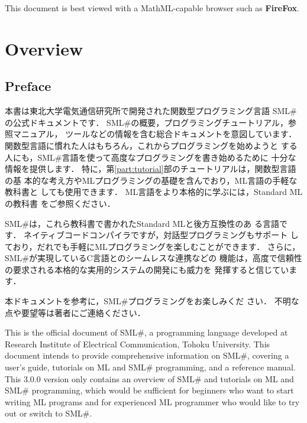 \documentclass{jbook}
\date{\today}
\title{\txt{プログラミング言語\smlsharp{}解説}{\smlsharp{} Document}}
\author{
\authors
}
\newif\ifjp
\newcommand{\txt}[2]{#2}
\newcommand{\smlsharp}{SML\#}
\newcommand{\version}{3.0.0}
\begin{document}
\maketitle

\tableofcontents


\ifjp%
{\bf FireFox}などのMathMLを表示可能なブラウザでご覧ください．
\else%
This document is best viewed with a MathML-capable browser such as {\bf FireFox}.
\fi%

%
\part{\txt{概要}{Overview}}
\label{part:outline}

\chapter{\txt{はじめに}{Preface}}

\ifjp%
	本書は東北大学電気通信研究所で開発された関数型プログラミング言語
\smlsharp{}の公式ドキュメントです．
	\smlsharp{}の概要，プログラミングチュートリアル，参照マニュアル，
ツールなどの情報を含む総合ドキュメントを意図しています．
	関数型言語に慣れた人はもちろん，これからプログラミングを始めようと
する人にも，\smlsharp{}言語を使って高度なプログラミングを書き始めるために
十分な情報を提供します．
	特に，第\ref{part:tutorial}部のチュートリアルは，関数型言語の基
本的な考え方やMLプログラミングの基礎を含んでおり，ML言語の手軽な教科書と
しても使用できます．
	ML言語をより本格的に学ぶには，Standard MLの教科書
\cite{ohori00sml}をご参照ください．
  
	\smlsharp{}は，これら教科書で書かれたStandard MLと後方互換性のあ
る言語です．
	ネイティブコードコンパイラですが，対話型プログラミングもサポート
しており，だれでも手軽にMLプログラミングを楽しむことができます．
	さらに，\smlsharp{}が実現しているC言語とのシームレスな連携などの
機能は，高度で信頼性の要求される本格的な実用的システムの開発にも威力を
発揮すると信じています． 
  
	本ドキュメントを参考に，\smlsharp{}プログラミングをお楽しみくだ
さい． 
	不明な点や要望等は著者にご連絡ください．

\else%
	This is the official document of \smlsharp{}, a programming
language developed at Research Institute of Electrical Communication,
Tohoku University.
	This document intends to provide comprehensive information on
\smlsharp{}, covering a user's guide, tutorials on ML and \smlsharp{}
programming, and a reference manual.
	This \version{} version only contains an overview of \smlsharp{}
and tutorials on ML and \smlsharp{} programming, which would be
sufficient for beginners who want to start writing ML programs and
for experienced ML programmer who would like to try out or switch to
\smlsharp{}.
\end{document}
